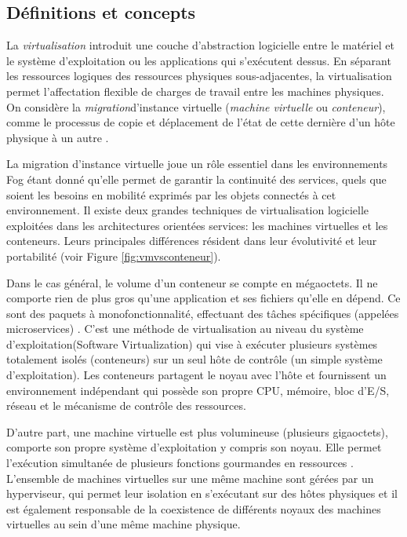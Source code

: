 \subsection{Définitions et concepts}
La \emph{\gls{virtualisation}} introduit une couche d'abstraction logicielle entre le matériel et le système d'exploitation ou les applications qui s'exécutent dessus. En séparant les ressources logiques des ressources physiques sous-adjacentes, la virtualisation permet l'affectation flexible de charges de travail entre les machines physiques.
On considère la \emph{\gls{migration}}d'instance virtuelle (\emph{\gls{machine virtuelle}} ou \emph{\gls{conteneur}}), comme le processus de copie et déplacement de l'état de cette dernière d'un hôte physique à un autre \cite{boutaba2013}.\par
La migration d'instance virtuelle joue un rôle essentiel dans les environnements Fog étant donné qu'elle permet de garantir la continuité des services, quels que soient les besoins en mobilité exprimés par les objets connectés à cet environnement.
Il existe deux grandes techniques de virtualisation logicielle exploitées dans les architectures orientées services: les machines virtuelles et les conteneurs. Leurs principales différences résident dans leur évolutivité et leur portabilité \cite{redhat} (voir Figure \ref{fig:vmvsconteneur}).\par
Dans le cas général, le volume d'un conteneur se compte en mégaoctets. Il ne comporte rien de plus gros qu'une application et ses fichiers qu'elle en dépend. Ce sont des paquets à monofonctionnalité, effectuant des tâches spécifiques (appelées microservices) \cite{redhat}. C'est une méthode de virtualisation au niveau du système d'exploitation(Software Virtualization) qui vise à exécuter plusieurs systèmes totalement isolés (conteneurs) sur un seul hôte de contrôle (un simple système d'exploitation). Les conteneurs partagent le noyau avec l'hôte et fournissent un environnement indépendant qui possède son propre CPU, mémoire, bloc d'E/S, réseau et le mécanisme de contrôle des ressources.\par
D'autre part, une machine virtuelle est plus volumineuse (plusieurs gigaoctets), comporte son propre système d'exploitation y compris son noyau. Elle permet l'exécution simultanée de plusieurs fonctions gourmandes en ressources \cite{microsoft2019}. L'ensemble de machines virtuelles sur une même machine sont gérées par un hyperviseur, qui permet leur isolation en s'exécutant sur des hôtes physiques et il est également responsable de la coexistence de différents noyaux des machines virtuelles au sein d'une même machine physique.\par

